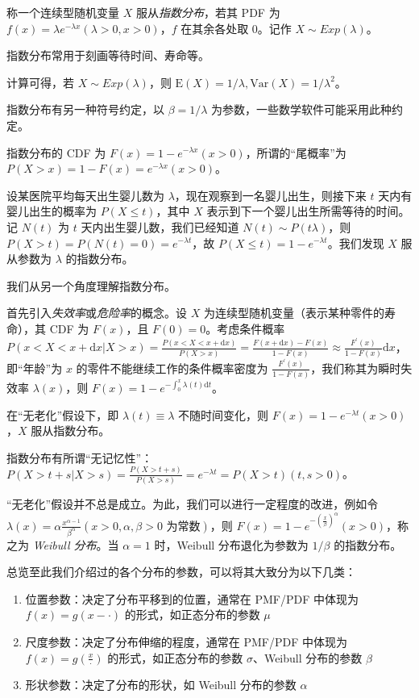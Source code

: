 \documentclass[../main.tex]{subfiles}
\begin{document}
\begin{definition}\label{def:2.5.3}
    称一个连续型随机变量 $X$ 服从\emph{指数分布}，若其 PDF 为 $f(x)=\lambda e^{-\lambda x}(\lambda>0,x>0)$，$f$ 在其余各处取 $0$。记作 $X\sim Exp(\lambda)$。
\end{definition}

指数分布常用于刻画等待时间、寿命等。

计算可得，若 $X\sim Exp(\lambda)$，则 $\mathrm{E}(X)=1/\lambda,\mathrm{Var}(X)=1/\lambda^2$。

指数分布有另一种符号约定，以 $\beta=1/\lambda$ 为参数，一些数学软件可能采用此种约定。

指数分布的 CDF 为 $F(x)=1-e^{-\lambda x}(x>0)$，所谓的“尾概率”为 $P(X>x)=1-F(x)=e^{-\lambda x}(x>0)$。

\begin{example}
    设某医院平均每天出生婴儿数为 $\lambda$，现在观察到一名婴儿出生，则接下来 $t$ 天内有婴儿出生的概率为 $P(X\leq t)$，其中 $X$ 表示到下一个婴儿出生所需等待的时间。\\
    记 $N(t)$ 为 $t$ 天内出生婴儿数，我们已经知道 $N(t)\sim P(t\lambda)$，则 $P(X>t)=P(N(t)=0)=e^{-\lambda t}$，故 $P(X\leq t)=1-e^{-\lambda t}$。我们发现 $X$ 服从参数为 $\lambda$ 的指数分布。
\end{example}

我们从另一个角度理解指数分布。

首先引入\emph{失效率}或\emph{危险率}的概念。设 $X$ 为连续型随机变量（表示某种零件的寿命），其 CDF 为 $F(x)$，且 $F(0)=0$。考虑条件概率 $P(x<X<x+\mathrm{d}x|X>x)=\frac{P(x<X<x+\mathrm{d}x)}{P(X>x)}=\frac{F(x+\mathrm{d}x)-F(x)}{1-F(x)}\approx\frac{F^\prime(x)}{1-F(x)}\mathrm{d}x$，即“年龄”为 $x$ 的零件不能继续工作的条件概率密度为 $\frac{F^\prime(x)}{1-F(x)}$，我们称其为瞬时失效率 $\lambda(x)$，则 $F(x)=1-e^{-\int_0^x\lambda(t)\mathrm{d}t}$。

在“无老化”假设下，即 $\lambda(t)\equiv \lambda$ 不随时间变化，则 $F(x)=1-e^{-\lambda t}(x>0)$，$X$ 服从指数分布。

指数分布有所谓“无记忆性”：$P(X>t+s|X>s)=\frac{P(X>t+s)}{P(X>s)}=e^{-\lambda t}=P(X>t)(t,s>0)$。

“无老化”假设并不总是成立。为此，我们可以进行一定程度的改进，例如令 $\lambda(x)=\alpha\frac{x^{\alpha-1}}{\beta^\alpha}(x>0,\alpha,\beta>0\text{ 为常数})$，则 $F(x)=1-e^{-(\frac{x}{\beta})^\alpha}(x>0)$，称之为 \emph{Weibull 分布}。当 $\alpha=1$ 时，Weibull 分布退化为参数为 $1/\beta$ 的指数分布。

总览至此我们介绍过的各个分布的参数，可以将其大致分为以下几类：
\begin{enumerate}
    \item 位置参数：决定了分布平移到的位置，通常在 PMF/PDF 中体现为 $f(x)=g(x-\cdot)$ 的形式，如正态分布的参数 $\mu$
    \item 尺度参数：决定了分布伸缩的程度，通常在 PMF/PDF 中体现为 $f(x)=g(\frac x\cdot)$ 的形式，如正态分布的参数 $\sigma$、Weibull 分布的参数 $\beta$
    \item 形状参数：决定了分布的形状，如 Weibull 分布的参数 $\alpha$
\end{enumerate}
\end{document}
